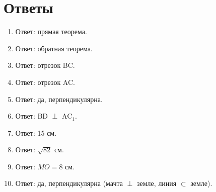\documentclass{umk-matematika}
\begin{document}
\section*{Ответы}

\begin{enumerate}
  \item Ответ: прямая теорема.
  \item Ответ: обратная теорема.
  \item Ответ: отрезок BC.
  \item Ответ: отрезок AC.
  \item Ответ: да, перпендикулярна.
  \item Ответ: BD $\perp$ AC$_1$.
  \item Ответ: 15 см.
  \item Ответ: $\sqrt{82}$ см.
  \item Ответ: $MO = 8$ см.
  \item Ответ: да, перпендикулярна (мачта $\perp$ земле, линия $\subset$ земле).
\end{enumerate}
\end{document}
